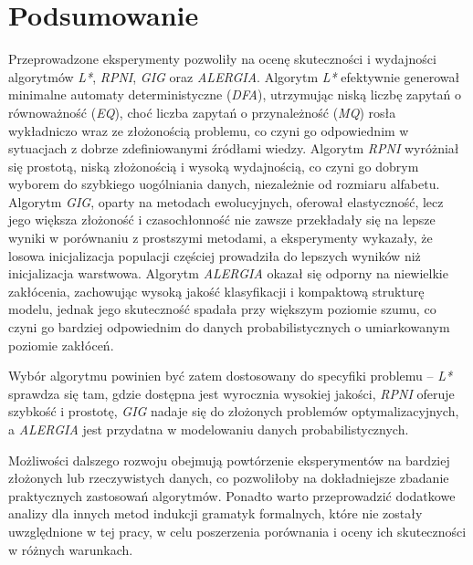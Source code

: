\section{Podsumowanie}  
Przeprowadzone eksperymenty pozwoliły na ocenę skuteczności i wydajności algorytmów \textit{L*}, \textit{RPNI}, \textit{GIG} oraz \textit{ALERGIA}. Algorytm \textit{L*} efektywnie generował minimalne automaty deterministyczne (\textit{DFA}), utrzymując niską liczbę zapytań o równoważność (\textit{EQ}), choć liczba zapytań o przynależność (\textit{MQ}) rosła wykładniczo wraz ze złożonością problemu, co czyni go odpowiednim w sytuacjach z dobrze zdefiniowanymi źródłami wiedzy. Algorytm \textit{RPNI} wyróżniał się prostotą, niską złożonością i wysoką wydajnością, co czyni go dobrym wyborem do szybkiego uogólniania danych, niezależnie od rozmiaru alfabetu. Algorytm \textit{GIG}, oparty na metodach ewolucyjnych, oferował elastyczność, lecz jego większa złożoność i czasochłonność nie zawsze przekładały się na lepsze wyniki w porównaniu z prostszymi metodami, a eksperymenty wykazały, że losowa inicjalizacja populacji częściej prowadziła do lepszych wyników niż inicjalizacja warstwowa. Algorytm \textit{ALERGIA} okazał się odporny na niewielkie zakłócenia, zachowując wysoką jakość klasyfikacji i kompaktową strukturę modelu, jednak jego skuteczność spadała przy większym poziomie szumu, co czyni go bardziej odpowiednim do danych probabilistycznych o umiarkowanym poziomie zakłóceń.  

Wybór algorytmu powinien być zatem dostosowany do specyfiki problemu – \textit{L*} sprawdza się tam, gdzie dostępna jest wyrocznia wysokiej jakości, \textit{RPNI} oferuje szybkość i prostotę, \textit{GIG} nadaje się do złożonych problemów optymalizacyjnych, a \textit{ALERGIA} jest przydatna w modelowaniu danych probabilistycznych.  

Możliwości dalszego rozwoju obejmują powtórzenie eksperymentów na bardziej złożonych lub rzeczywistych danych, co pozwoliłoby na dokładniejsze zbadanie praktycznych zastosowań algorytmów. Ponadto warto przeprowadzić dodatkowe analizy dla innych metod indukcji gramatyk formalnych, które nie zostały uwzględnione w tej pracy, w celu poszerzenia porównania i oceny ich skuteczności w różnych warunkach.
